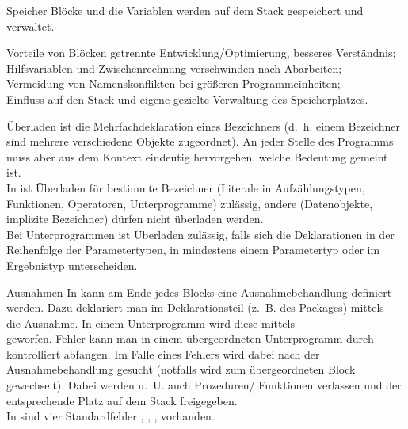 \begin{Def}{Speicher}
    Blöcke und die Variablen werden auf dem Stack gespeichert und verwaltet.
\end{Def}

\begin{Def}{Vorteile von Blöcken}
    getrennte Entwicklung/Optimierung, besseres Verständnis; \\
    Hilfsvariablen und Zwischenrechnung verschwinden nach Abarbeiten; \\
    Vermeidung von Namenskonflikten bei größeren Programmeinheiten; \\
    Einfluss auf den Stack und eigene gezielte Verwaltung des Speicherplatzes.
\end{Def}

\begin{Def}{Überladen}
     ist die Mehrfachdeklaration eines Bezeichners
    (d.~h. einem Bezeichner sind mehrere verschiedene Objekte zugeordnet).
    An jeder Stelle des Programms muss aber aus dem Kontext eindeutig
    hervorgehen, welche Bedeutung gemeint ist. \\
    In \Ada{} ist Überladen für bestimmte Bezeichner (Literale in
    Aufzählungstypen, Funktionen, Operatoren, Unterprogramme) zulässig,
    andere (Datenobjekte, implizite Bezeichner) dürfen nicht überladen
    werden. \\
    Bei Unterprogrammen ist Überladen zulässig, falls sich die Deklarationen
    in der Reihenfolge der Parametertypen, in mindestens einem Parametertyp
    oder im Ergebnistyp unterscheiden.
\end{Def}

\begin{Def}{Ausnahmen}
    In \Ada{} kann am Ende jedes Blocks eine Ausnahmebehandlung definiert
    werden.
    Dazu deklariert man im Deklarationsteil (z.~B. des Packages) mittels \\
     die Ausnahme.
    In einem Unterprogramm wird diese mittels \\
     geworfen.
    Fehler kann man in einem übergeordneten Unterprogramm
    durch  kontrolliert abfangen.
    Im Falle eines Fehlers wird dabei nach der Ausnahmebehandlung gesucht
    (notfalls wird zum übergeordneten Block gewechselt).
    Dabei werden u.~U. auch Prozeduren/ Funktionen verlassen und der
    entsprechende Platz auf dem Stack freigegeben. \\
    In \Ada{} sind vier Standardfehler ,
    , , 
    vorhanden.
\end{Def}


